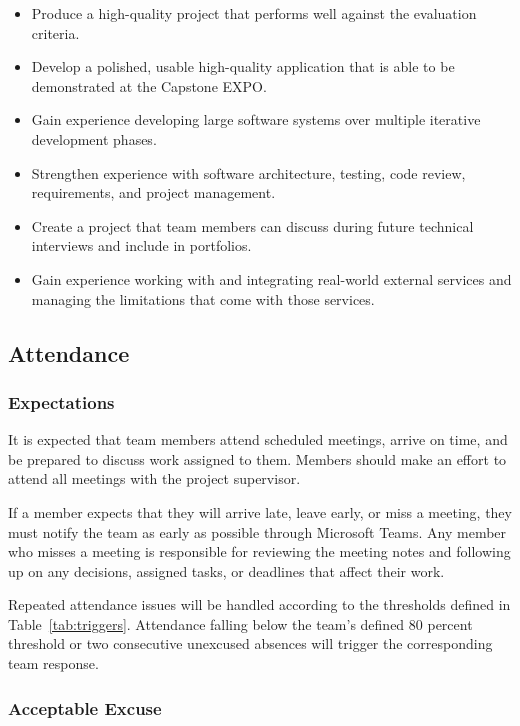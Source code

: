 \documentclass{article}
\begin{document}
\begin{itemize}
  \item Produce a high-quality project that performs well against the evaluation criteria.
  \item Develop a polished, usable high-quality application that is able to be demonstrated at the Capstone EXPO.
  \item Gain experience developing large software systems over multiple iterative development phases.
  \item Strengthen experience with software architecture, testing, code review, requirements, and project management.
  \item Create a project that team members can discuss during future technical interviews and include in portfolios.
  \item Gain experience working with and integrating real-world external services and managing the limitations that come with those services.
\end{itemize}

\subsection*{Attendance}
\label{sec:attendance}

\subsubsection*{Expectations}

It is expected that team members attend scheduled meetings, arrive on time, and be prepared to discuss
work assigned to them. Members should make an effort to attend all meetings with the project supervisor.

If a member expects that they will arrive late, leave early, or miss a meeting, they must notify the team
as early as possible through Microsoft Teams. 
Any member who misses a meeting is responsible for reviewing the meeting notes and following up on any 
decisions, assigned tasks, or deadlines that affect their work.

Repeated attendance issues will be handled according to the thresholds defined in Table~\ref{tab:triggers}. Attendance falling below
the team's defined 80 percent threshold or two consecutive unexcused absences will trigger the 
corresponding team response.

\subsubsection*{Acceptable Excuse}
\end{document}
